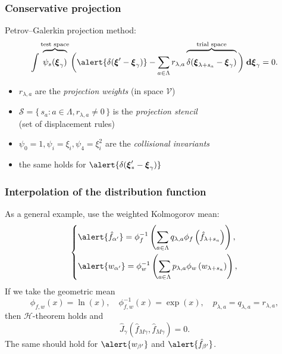 \documentclass[mathserif]{beamer} %
\newcommand{\dd}{\:\mathrm{d}}
\newcommand{\dxi}{\boldsymbol{\dd\xi}}
\newcommand{\bxi}{\boldsymbol{\xi}}
\newcommand{\Set}[2]{\{\,{#1}:{#2}\,\}}
\newcommand{\xoverbrace}[2][\vphantom{\int}]{\overbrace{#1#2}}
\begin{document}
\begin{frame}
    \frametitle{Conservative projection}
    \vspace{10pt}

    Petrov--Galerkin projection method:
    \begin{equation}\label{eq:Petrov-Galerkin}
        \int \xoverbrace{ \psi_s(\bxi_\gamma) }^\text{test space} \bigg(
            \alert{\delta(\bxi'-\bxi_\gamma)} - \sum_{a\in\Lambda} r_{\lambda,a}
            \xoverbrace{ \delta(\bxi_{\lambda+s_a}-\bxi_\gamma) }^\text{trial space}
        \bigg) \dxi_\gamma = 0.
    \end{equation}
    \begin{itemize}
        \item \(r_{\lambda,a}\) are the \emph{projection weights} (in space \(\mathcal{V}\))
        \item \(\mathcal{S} = \Set{s_a}{a\in\Lambda, r_{\lambda,a}\neq0}\) is the \emph{projection stencil}
            \\ (set of displacement rules)
        \item \(\psi_0 = 1, \psi_i = \xi_i, \psi_4 = \xi_i^2\) are the \emph{collisional invariants}
        \item the same holds for \(\alert{\delta(\bxi'_*-\bxi_\gamma)}\)
    \end{itemize}
\end{frame}

\begin{frame}
    \frametitle{Interpolation of the distribution function}
    As a general example, use the weighted Kolmogorov mean: %
    \begin{equation}\label{eq:Kolmogorov_mean}
        \begin{dcases}
            \alert{\hat{f}_{\alpha'}} = \phi^{-1}_f\left(\sum_{a\in\Lambda} q_{\lambda,a}
                \phi_f\left(\hat{f}_{\lambda+s_a}\right)\right), \\
            \alert{w_{\alpha'}} = \phi^{-1}_w\left(\sum_{a\in\Lambda} p_{\lambda,a}
                \phi_w\left(w_{\lambda+s_a}\right)\right), \\
        \end{dcases}
    \end{equation}
    If we take the geometric mean
    \begin{equation}\label{eq:geometric_mean}
       \phi_{f,w}(x) = \ln(x), \quad \phi_{f,w}^{-1}(x) = \exp(x), \quad p_{\lambda,a} = q_{\lambda,a} = r_{\lambda,a},
    \end{equation}
    then \(\mathcal{H}\)-theorem holds and
    \begin{equation}\label{eq:strict_interpolation}
        \hat{J}_\gamma(\hat{f}_{M\gamma}, \hat{f}_{M\gamma}) = 0.
    \end{equation}
    The same should hold for \(\alert{w_{\beta'}}\) and \(\alert{\hat{f}_{\beta'}}\).
\end{frame}
\end{document}
